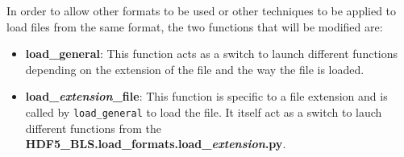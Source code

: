 In order to allow other formats to be used or other techniques to be applied to load files from the same format, the two functions that will be modified are:
\begin{itemize}
    \item \textbf{load\_general}: This function acts as a switch to launch different functions depending on the extension of the file and the way the file is loaded.
    \item \textbf{load\_\textit{extension}\_file}: This function is specific to a file extension and is called by \texttt{load\_general} to load the file. It itself act as a switch to lauch different functions from the \\ \textbf{HDF5\_BLS.load\_formats.load\_\textit{extension}.py}.
\end{itemize}